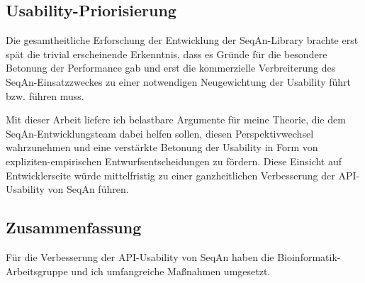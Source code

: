 \subsection{Usability-Priorisierung}

Die gesamtheitliche Erforschung der Entwicklung der SeqAn-Library brachte erst spät die trivial erscheinende Erkenntnis, dass es Gründe für die besondere Betonung der Performance gab und erst die kommerzielle Verbreiterung des SeqAn-Einsatzzweckes zu einer notwendigen Neugewichtung der Usability führt bzw. führen muss.

Mit dieser Arbeit liefere ich belastbare Argumente für meine Theorie, die dem SeqAn-Entwicklungsteam dabei helfen sollen, diesen Perspektivwechsel wahrzunehmen und eine verstärkte Betonung der Usability in Form von expliziten-empirischen Entwurfsentscheidungen zu fördern. Diese Einsicht auf Entwicklerseite würde mittelfristig zu einer ganzheitlichen Verbesserung der API-Usability von SeqAn führen.



\subsection{Zusammenfassung}

Für die Verbesserung der API-Usability von SeqAn haben die Bioinformatik-Arbeitsgruppe und ich umfangreiche Maßnahmen umgesetzt.

